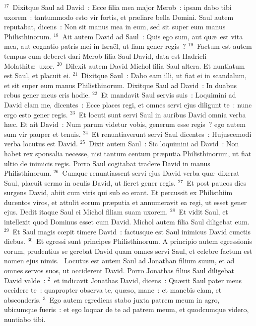 ${}^{17}$~Dixitque Saul ad David~: Ecce filia mea major Merob~: ipsam dabo tibi uxorem~: tantummodo esto vir fortis, et pr\ae liare bella Domini. Saul autem reputabat, dicens~: Non sit manus mea in eum, sed sit super eum manus Philisthinorum.
${}^{18}$~Ait autem David ad Saul~: Quis ego sum, aut qu\ae\ est vita mea, aut cognatio patris mei in Isra\"el, ut fiam gener regis~?
${}^{19}$~Factum est autem tempus cum deberet dari Merob filia Saul David, data est Hadrieli Molathit\ae\ uxor.
${}^{20}$~Dilexit autem David Michol filia Saul altera. Et nuntiatum est Saul, et placuit ei.
${}^{21}$~Dixitque Saul~: Dabo eam illi, ut fiat ei in scandalum, et sit super eum manus Philisthinorum. Dixitque Saul ad David~: In duabus rebus gener meus eris hodie.
${}^{22}$~Et mandavit Saul servis suis~: Loquimini ad David clam me, dicentes~: Ecce places regi, et omnes servi ejus diligunt te~: nunc ergo esto gener regis.
${}^{23}$~Et locuti sunt servi Saul in auribus David omnia verba h\ae c. Et ait David~: Num parum videtur vobis, generum esse regis~? ego autem sum vir pauper et tenuis.
${}^{24}$~Et renuntiaverunt servi Saul dicentes~: Hujuscemodi verba locutus est David.
${}^{25}$~Dixit autem Saul~: Sic loquimini ad David~: Non habet rex sponsalia necesse, nisi tantum centum pr\ae putia Philisthinorum, ut fiat ultio de inimicis regis. Porro Saul cogitabat tradere David in manus Philisthinorum.
${}^{26}$~Cumque renuntiassent servi ejus David verba qu\ae\ dixerat Saul, placuit sermo in oculis David, ut fieret gener regis.
${}^{27}$~Et post paucos dies surgens David, abiit cum viris qui sub eo erant. Et percussit ex Philisthiim ducentos viros, et attulit eorum pr\ae putia et annumeravit ea regi, ut esset gener ejus. Dedit itaque Saul ei Michol filiam suam uxorem.
${}^{28}$~Et vidit Saul, et intellexit quod Dominus esset cum David. Michol autem filia Saul diligebat eum.
${}^{29}$~Et Saul magis cœpit timere David~: factusque est Saul inimicus David cunctis diebus.
${}^{30}$~Et egressi sunt principes Philisthinorum. A principio autem egressionis eorum, prudentius se gerebat David quam omnes servi Saul, et celebre factum est nomen ejus nimis.
~Locutus est autem Saul ad Jonathan filium suum, et ad omnes servos suos, ut occiderent David. Porro Jonathas filius Saul diligebat David valde~:
${}^{2}$~et indicavit Jonathas David, dicens~: Qu\ae rit Saul pater meus occidere te~: quapropter observa te, qu\ae so, mane~: et manebis clam, et absconderis.
${}^{3}$~Ego autem egrediens stabo juxta patrem meum in agro, ubicumque fueris~: et ego loquar de te ad patrem meum, et quodcumque videro, nuntiabo tibi.
